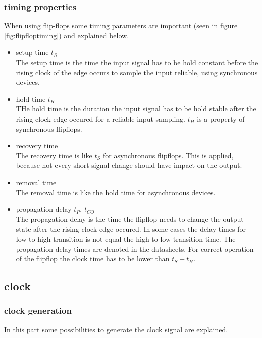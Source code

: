 \subsubsection{timing properties}
When using flip-flops some timing parameters are important (seen in figure \ref{fig:flipfloptiming}) and explained below.
\begin{itemize}
\item setup time $t_{S}$\\
The setup time is the time the input signal has to be hold constant before the rising clock of the edge occurs to sample the input reliable, using synchronous devices.
\item hold time $t_{H}$\\
THe hold time is the duration the input signal has to be hold stable after the rising clock edge occured for a reliable input sampling. $t_{H}$ is a property of synchronous flipflops.
\item recovery time\\
The recovery time is like $t_{S}$ for asynchronous flipflops. This is applied, because not every short signal change should have impact on the output. 
\item removal time\\
The removal time is like the hold time for asynchronous devices.
\item propagation delay $t_{P}$, $t_{CO}$\\
The propagation delay is the time the flipflop needs to change the output state after the rising clock edge occured. In some cases the delay times for low-to-high transition is not equal the high-to-low transition time. The propagation delay times are denoted in the datasheets. For correct operation of the flipflop the clock time has to be lower than $t_{S}+t_{H}$.
\end{itemize}
\subsection{clock}

\subsubsection{clock generation}
In this part some possibilities to generate the clock signal are explained.
